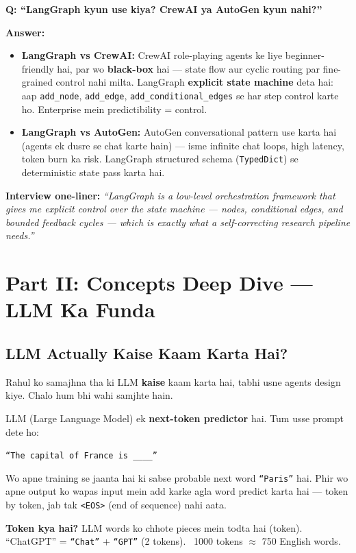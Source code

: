\documentclass[11pt, a4paper]{article}
\begin{document}
\begin{interviewbox}
\textbf{Q: ``LangGraph kyun use kiya? CrewAI ya AutoGen kyun nahi?''}

\textbf{Answer:}
\begin{itemize}
\item \textbf{LangGraph vs CrewAI:} CrewAI role-playing agents ke liye beginner-friendly hai, par wo \textbf{black-box} hai --- state flow aur cyclic routing par fine-grained control nahi milta. LangGraph \textbf{explicit state machine} deta hai: aap \texttt{add\_node}, \texttt{add\_edge}, \texttt{add\_conditional\_edges} se har step control karte ho. Enterprise mein predictibility = control.
\item \textbf{LangGraph vs AutoGen:} AutoGen conversational pattern use karta hai (agents ek dusre se chat karte hain) --- isme infinite chat loops, high latency, token burn ka risk. LangGraph structured schema (\texttt{TypedDict}) se deterministic state pass karta hai.
\end{itemize}

\textbf{Interview one-liner:} \textit{``LangGraph is a low-level orchestration framework that gives me explicit control over the state machine --- nodes, conditional edges, and bounded feedback cycles --- which is exactly what a self-correcting research pipeline needs.''}
\end{interviewbox}

\newpage

\section{Part II: Concepts Deep Dive --- LLM Ka Funda}

\subsection{LLM Actually Kaise Kaam Karta Hai?}

\begin{storybox}
Rahul ko samajhna tha ki LLM \textbf{kaise} kaam karta hai, tabhi usne agents design kiye. Chalo hum bhi wahi samjhte hain.

LLM (Large Language Model) ek \textbf{next-token predictor} hai. Tum usse prompt dete ho:
\begin{center}
\texttt{``The capital of France is \_\_\_\_''}
\end{center}
Wo apne training se jaanta hai ki sabse probable next word \texttt{``Paris''} hai. Phir wo apne output ko wapas input mein add karke agla word predict karta hai --- token by token, jab tak \texttt{<EOS>} (end of sequence) nahi aata.

\textbf{Token kya hai?} LLM words ko chhote pieces mein todta hai (token). ``ChatGPT'' = \texttt{``Chat''} + \texttt{``GPT''} (2 tokens). ~1000 tokens $\approx$ 750 English words.
\end{storybox}
\end{document}
